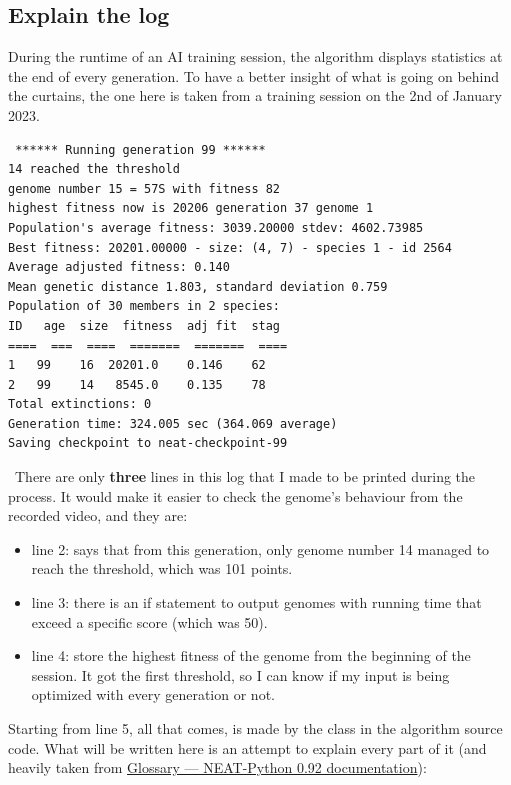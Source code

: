 \subsection{Explain the log}\label{sec:explain-the-log}

During the runtime of an AI training session, the algorithm displays statistics at the end of every generation. To have a better insight of what is going on behind the curtains, the one here is taken from a training session on the 2nd of January 2023.

\begin{listing}[H]
\begin{verbatim}
 ****** Running generation 99 ****** 
14 reached the threshold
genome number 15 = 57S with fitness 82
highest fitness now is 20206 generation 37 genome 1
Population's average fitness: 3039.20000 stdev: 4602.73985
Best fitness: 20201.00000 - size: (4, 7) - species 1 - id 2564
Average adjusted fitness: 0.140
Mean genetic distance 1.803, standard deviation 0.759
Population of 30 members in 2 species:
ID   age  size  fitness  adj fit  stag
====  ===  ====  =======  =======  ====
1   99    16  20201.0    0.146    62
2   99    14   8545.0    0.135    78
Total extinctions: 0
Generation time: 324.005 sec (364.069 average)
Saving checkpoint to neat-checkpoint-99
\end{verbatim}
\end{listing}
 There are only \textbf{three} lines in this log that I made to be printed during the process. It would make it easier to check the genome's behaviour from the recorded video, and they are:
 \begin{itemize}
\item line 2: says that from this generation, only genome number 14 managed to reach the threshold, which was 101 points.
\item line 3: there is an if statement to output genomes with running time that exceed a specific score (which was 50).
\item line 4: store the highest fitness of the genome from the beginning of the session. It got the first threshold, so I can know if my input is being optimized with every generation or not.
 \end{itemize}

Starting from line 5, all that comes, is made by the  class in the algorithm source code. What will be written here is an attempt to explain every part of it (and heavily taken from \href{https://neat-python.readthedocs.io/en/latest/glossary.html}{Glossary — NEAT-Python 0.92 documentation}):


